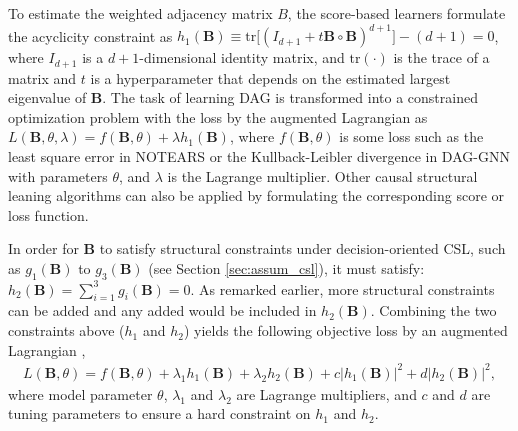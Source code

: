 To estimate the weighted adjacency matrix $B$, %
the score-based learners formulate the acyclicity constraint \citep{yu2019dag,zheng2018dags}  as 
$    h_1(\boldsymbol{B})\equiv \text{tr}\big[(I_{d+1}+t \boldsymbol{B} \circ \boldsymbol{B})^{d+1}\big]-(d+1)=0 $, 
where $I_{d+1}$ is a $d+1$-dimensional identity matrix, and $\text{tr}(\cdot)$ is the trace of a matrix and $t$ is a hyperparameter that depends on the estimated largest eigenvalue of $\boldsymbol{B}$. 
The task of learning DAG is transformed into a constrained optimization problem with the loss by the augmented Lagrangian as
$L(\boldsymbol{B},\theta,\lambda)=f(\boldsymbol{B},\theta)+\lambda h_1(\boldsymbol{B})$, 
where $f(\boldsymbol{B},\theta)$ is some loss such as the least square error in NOTEARS \citep{zheng2018dags} or the Kullback-Leibler divergence in DAG-GNN \citep{yu2019dag} with parameters $\theta$, and $\lambda$ is the Lagrange multiplier.  
Other causal structural leaning algorithms \citep[see e.g.,][]{spirtes2000constructing,chickering2002optimal,shimizu2006linear,kalisch2007estimating,buhlmann2014cam,ramsey2017million,zhu2019causal} can also be applied by formulating the corresponding score or loss function. 

In order for $\boldsymbol{B}$ to satisfy  structural constraints under decision-oriented \acrshort{CSL}, such as $g_1(\boldsymbol{B})$ to $ g_3(\boldsymbol{B})$ (see Section \ref{sec:assum_csl}), it must satisfy: $
h_2(\boldsymbol{B}) =\sum_{i=1}^3 g_i(\boldsymbol{B}) =0.$ As remarked earlier, more structural constraints can be added and any added would be included in $h_2(\boldsymbol{B})$. Combining the two constraints above ($h_1$ and $h_2$) yields the following objective loss by an augmented Lagrangian 
\citep{cai2020anoce}, 
\begin{align*}
    L(\boldsymbol{B},\theta) = f(\boldsymbol{B},\theta) + \lambda_1 h_1(\boldsymbol{B})  +  \lambda_2 h_2(\boldsymbol{B}) + c|h_1(\boldsymbol{B})|^2 + d|h_2(\boldsymbol{B})|^2,
\end{align*}
where model parameter $\theta$, $\lambda_1$ and $\lambda_2$ are Lagrange multipliers, and $c$ and $d$ are tuning parameters to ensure a hard constraint on $h_1$ and $h_2$. 

